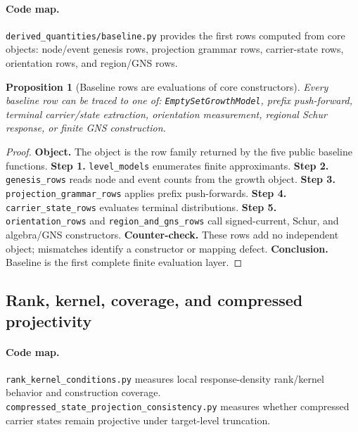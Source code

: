 \documentclass[11pt]{article}
\newtheorem{proposition}[definition]{Proposition}
\theoremstyle{remark}
\newcommand{\code}[1]{\texttt{#1}}
\numberwithin{equation}{section}
\begin{document}
\paragraph{Code map.} \code{derived\_\allowbreak{}quantities/baseline.py} provides the first rows computed from core objects: node/event genesis rows, projection grammar rows, carrier-state rows, orientation rows, and region/GNS rows.

\begin{proposition}[Baseline rows are evaluations of core constructors]
Every baseline row can be traced to one of: \code{EmptySetGrowthModel}, prefix push-forward, terminal carrier/state extraction, orientation measurement, regional Schur response, or finite GNS construction.
\end{proposition}
\begin{proof}
\textbf{Object.} The object is the row family returned by the five public baseline functions. \textbf{Step 1.} \code{level\_\allowbreak{}models} enumerates finite approximants. \textbf{Step 2.} \code{genesis\_\allowbreak{}rows} reads node and event counts from the growth object. \textbf{Step 3.} \code{projection\_\allowbreak{}grammar\_\allowbreak{}rows} applies prefix push-forwards. \textbf{Step 4.} \code{carrier\_\allowbreak{}state\_\allowbreak{}rows} evaluates terminal distributions. \textbf{Step 5.} \code{orientation\_\allowbreak{}rows} and \code{region\_\allowbreak{}and\_\allowbreak{}gns\_\allowbreak{}rows} call signed-current, Schur, and algebra/GNS constructors. \textbf{Counter-check.} These rows add no independent object; mismatches identify a constructor or mapping defect. \textbf{Conclusion.} Baseline is the first complete finite evaluation layer.
\end{proof}

\subsection{Rank, kernel, coverage, and compressed projectivity}
\paragraph{Code map.} \code{rank\_\allowbreak{}kernel\_\allowbreak{}conditions.py} measures local response-density rank/kernel behavior and construction coverage. \code{compressed\_\allowbreak{}state\_\allowbreak{}projection\_\allowbreak{}consistency.py} measures whether compressed carrier states remain projective under target-level truncation.
\end{document}
